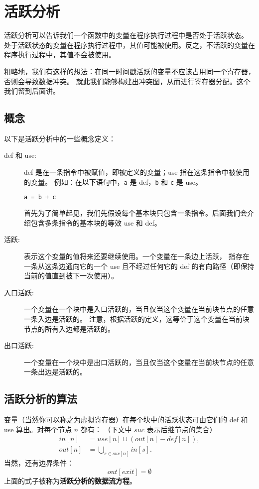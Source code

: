\section{活跃分析}

活跃分析可以告诉我们一个函数中的变量在程序执行过程中是否处于活跃状态。
处于活跃状态的变量在程序执行过程中，其值可能被使用。反之，不活跃的变量在程序执行过程中，其值不会被使用。

粗略地，我们有这样的想法：在同一时间戳活跃的变量不应该占用同一个寄存器，否则会导致数据冲突。
就此我们能够构建出冲突图，从而进行寄存器分配。这个我们留到后面讲。

\subsection{概念}

以下是活跃分析中的一些概念定义：

\begin{description}
    \item[def 和 use:]def 是在一条指令中被赋值，即被定义的变量；use 指在这条指令中被使用的变量。
例如：在以下语句中，\texttt{a} 是 def，\texttt{b} 和 \texttt{c} 是 use。
\begin{lstlisting}[language=c]
    a = b + c
\end{lstlisting}

首先为了简单起见，我们先假设每个基本块只包含一条指令。后面我们会介绍包含多条指令的基本块的等效 use 和 def。

\item[活跃:] 表示这个变量的值将来还要继续使用。一个变量在一条边上活跃，
  指存在一条从这条边通向它的一个 use 且不经过任何它的 def 的有向路径（即保持当前的值直到被下一次使用）。

\item[入口活跃:] 一个变量在一个块中是入口活跃的，当且仅当这个变量在当前块节点的任意一条入边是活跃的。
  注意，根据活跃的定义，这等价于这个变量在当前块节点的所有入边都是活跃的。

\item[出口活跃:] 一个变量在一个块中是出口活跃的，当且仅当这个变量在当前块节点的任意一条出边是活跃的。

\end{description}

\subsection{活跃分析的算法}

变量（当然你可以称之为虚拟寄存器）在每个块中的活跃状态可由它们的 def 和 use 算出。对每个节点 $n$ 都有：
（下文中 $\mathit{suc}$ 表示后继节点的集合）
\begin{align*}
\mathit{in}[n]  &= \mathit{use}[n] \cup (\mathit{out}[n] - \mathit{def}[n]), \\
\mathit{out}[n] &= \bigcup_{s \in \mathit{suc}[n]} \mathit{in}[s].
\end{align*}
当然，还有边界条件：
$$
\mathit{out}[\mathit{exit}] = \emptyset
$$
上面的式子被称为\textbf{活跃分析的数据流方程}。

